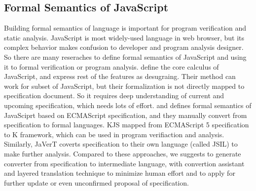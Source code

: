 \subsection{Formal Semantics of JavaScript}
Building formal semantics of language is important for program verification and static analysis. JavaScript is most widely-used language in
web browser, but its complex behavior makes confusion to developer and program analysis designer. So there are many reseraches to define formal semantics of JavaScript and
using it to formal verification or program analysis. \cite{lambdajs} define the core calculus of JavaScript, and express rest of the features as desugraing. Their method can
work for subset of JavaScript, but their formalization is not directly mapped to specification document. So it requires deep understanding of current and upcoming specification,
which needs lots of effort. \cite{kjs} and \cite{javert} defines formal semantics of JavaSciprt based on ECMAScript specification, and they manually convert from specification
to formal languages. KJS mapped from ECMAScript 5 specification to K framework, which can be used in program verifiaction and analysis. Similarly, JaVerT coverts specification
to their own language (called JSIL) to make further analysis. Compared to these approaches, we suggests to generate converter from specification to intermediate language, with
convertion assistant and layered translation technique to minimize human effort and to apply for further update or even unconfirmed proposal of specification.


